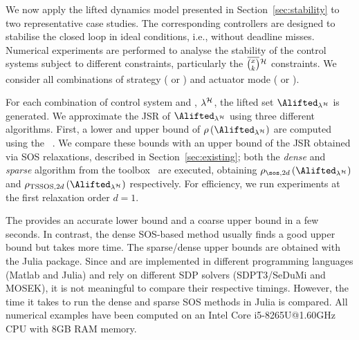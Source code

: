 We now apply the lifted dynamics model presented in Section~\ref{sec:stability} to two representative case studies.
The corresponding controllers are designed to stabilise the closed loop in ideal conditions, i.e., without deadline misses.
Numerical experiments are performed to analyse the stability of the control systems subject to different constraints, particularly the $\eanymiss{}{\strat}$ constraints.
We consider all combinations of strategy (\tK{} or \tS{}) and actuator mode (\tZ{} or \tH{}).

For each combination of control system and \ewhc{}, $\lambda^{\mathcal{H}}$, the lifted set $\Alifted_{\lambda^\strat}$ is generated.
We approximate the JSR of $\Alifted_{\lambda^\strat}$ using three different algorithms.
First, a lower and upper bound of $\rho \left( \Alifted_{\lambda^\strat} \right)$ are computed using the ~\cite{vankeerberghen2014jsr}.
We compare these bounds with an upper bound of the JSR obtained via SOS relaxations, described in Section~\ref{sec:existing}; both the \emph{dense} and \emph{sparse} algorithm from the  toolbox~\cite{sparsejsr} are executed, obtaining $\rho_{\sos,2d}\left(\Alifted_{\lambda^\strat}\right)$ and $\rho_{\textrm{TSSOS},2d}\left(\Alifted_{\lambda^\strat}\right)$ respectively.
%
For efficiency, we run experiments at the first relaxation order $d = 1$.

The  provides an accurate lower bound and a coarse upper bound in a few seconds.
In contrast, the dense SOS-based method usually finds a good upper bound but takes more time.
The sparse/dense upper bounds are obtained with the  Julia package.
Since  and  are implemented in different programming languages (Matlab and Julia) and rely on different SDP solvers (SDPT3/SeDuMi and MOSEK), it is not meaningful to compare their respective timings.
However, the time it takes to run the dense and sparse SOS methods in Julia is compared.
All numerical examples have been computed on an Intel Core i5-8265U@1.60GHz CPU with 8GB RAM memory.

